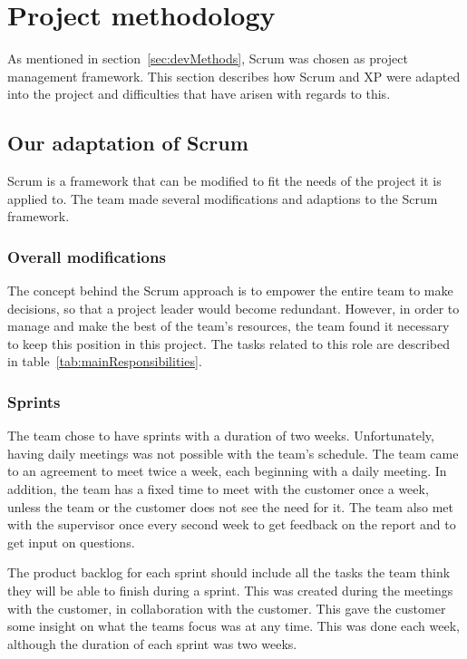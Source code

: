 \newpage
\section{Project methodology}
\label{sec:scrumDevProcess}

As mentioned in section~\ref{sec:devMethods}, Scrum was chosen as project management framework. This section describes how Scrum and XP were adapted into the project and difficulties that have arisen with regards to this.

\subsection{Our adaptation of Scrum}
Scrum is a framework that can be modified to fit the needs of the project it is applied to. The team made several modifications and adaptions to the Scrum framework. 

\subsubsection{Overall modifications}
The concept behind the Scrum approach is to empower the entire team to make decisions, so that a project leader would become redundant. However, in order to manage and make the best of the team's resources, the team found it necessary to keep this position in this project. The tasks related to this role are described in table~\ref{tab:mainResponsibilities}.

\subsubsection{Sprints}
The team chose to have sprints with a duration of two weeks. Unfortunately, having daily meetings was not possible with the team's schedule. The team came to an agreement to meet twice a week, each beginning with a daily meeting. In addition, the team has a fixed time to meet with the customer once a week, unless the team or the customer does not see the need for it. The team also met with the supervisor once every second week to get feedback on the report and to get input on questions.

The product backlog for each sprint should include all the tasks the team think they will be able to finish during a sprint. This was created during the meetings with the customer, in collaboration with the customer. This gave the customer some insight on what the teams focus was at any time. This was done each week, although the duration of each sprint was two weeks.

